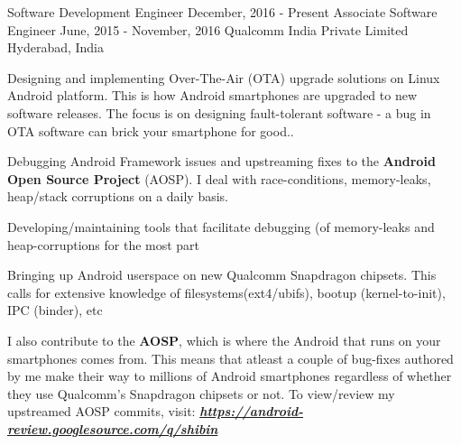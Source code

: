 

\begin{cvtwoposentries}

  \cvtwoposentry
    {Software Development Engineer} %
    {December, 2016 - Present} %
    {Associate Software Engineer}
    {June, 2015 - November, 2016}
    {Qualcomm India Private Limited} %
    {Hyderabad, India} %
    {
      \begin{cvitems} %
        \item {Designing and implementing Over-The-Air (OTA) upgrade solutions on Linux Android platform. This is how Android smartphones are upgraded to new software releases. \newline
        The focus is on designing fault-tolerant software - a bug in OTA software can brick your smartphone for good..}
        \item {Debugging Android Framework issues and upstreaming fixes to the \textbf{Android Open Source Project} (AOSP). I deal with race-conditions, memory-leaks, heap/stack corruptions on a daily basis.}
        \item {Developing/maintaining tools that facilitate debugging (of memory-leaks and heap-corruptions for the most part}
        \item {Bringing up Android userspace on new Qualcomm Snapdragon chipsets. This calls for extensive knowledge of filesystems(ext4/ubifs), bootup (kernel-to-init), IPC (binder), etc}
        \item {I also contribute to the \textbf{AOSP}, which is where the Android that runs on your smartphones comes from. This means that atleast a couple of bug-fixes authored by me make their way to millions of Android smartphones regardless of whether they use Qualcomm's Snapdragon chipsets or not. \newline
        To view/review my upstreamed AOSP commits, visit: \textit{\textbf{\url{https://android-review.googlesource.com/q/shibin}}}}
      \end{cvitems}
    }

  
\end{cvtwoposentries}

